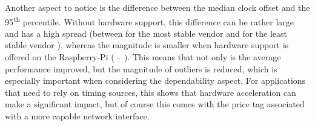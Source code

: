 %
Another aspect to notice is the difference between the median clock offset and the 95\textsuperscript{th} percentile. Without hardware support, this difference can be rather large and has a high spread (between \fRatio{\cmpMin} for the most stable vendor \fVendor{\cmpMinArg} and \fRatio{\cmpMax} for the least stable vendor \fVendor{\cmpMaxArg}),
whereas the magnitude is smaller when hardware support is offered on the Raspberry-Pi %
%
(\fRatio[1]{\cmpMin} \fVendor{\cmpMinArg} -- \fRatio[1]{\cmpMax} \fVendor{\cmpMaxArg}).
This means that not only is the average performance improved, but the magnitude of outliers is reduced, which is especially important when considering the dependability aspect. For applications that need to rely on timing sources, this shows that hardware acceleration can make a significant impact, but of course this comes with the price tag associated with a more capable network interface.

